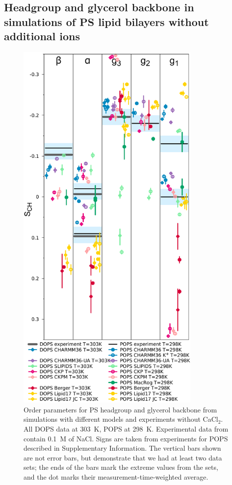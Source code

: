 \documentclass[aps,prl,superscriptaddress,twocolumn]{revtex4}
\begin{document}
\subsection{Headgroup and glycerol backbone in simulations of PS lipid bilayers without additional ions}
\begin{figure}[]
  \centering
  \includegraphics[width=9.0cm]{../Figs/HGorderparametersPS.pdf}
  \caption{\label{HGorderParametersPS}
    Order parameters for PS headgroup and glycerol
    backbone from simulations with different models and experiments without CaCl$_2$.
    All DOPS data at 303~K, POPS at 298~K.
    Experimental data from \cite{browning80} contain 0.1~M of NaCl.
    Signs are taken from experiments for POPS described in Supplementary Information.
    The vertical bars shown %
    are not error bars, but demonstrate that %
    we had at least two data sets; the ends of the bars mark the extreme values from the sets, and the dot marks their measurement-time-weighted average.
  }
\end{figure}
\end{document}
